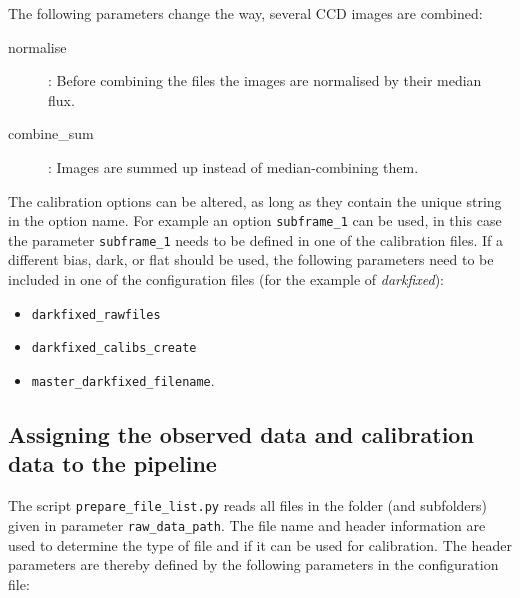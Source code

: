 \documentclass[10pt,a4paper]{article}
\begin{document}
\noindent The following parameters change the way, several CCD images are combined:
\begin{description}
  \item[normalise] : Before combining the files the images are normalised by their median flux.
  \item[combine\_sum] : Images are summed up instead of median-combining them.
\end{description}

\noindent The calibration options can be altered, as long as they contain the unique string in the option name. For example an option \verb|subframe_1| can be used, in this case the parameter \verb|subframe_1| needs to be defined in one of the calibration files. If a different bias, dark, or flat should be used, the following parameters need to be included in one of the configuration files (for the example of \textit{darkfixed}):
\begin{itemize}\setlength\itemsep{0em}
  \item \verb|darkfixed_rawfiles|
  \item \verb|darkfixed_calibs_create|
  \item \verb|master_darkfixed_filename|.
\end{itemize}


\subsection{Assigning the observed data and calibration data to the pipeline}
\label{Section:prepare_files}

The script \verb|prepare_file_list.py| reads all files in the folder (and subfolders) given in parameter \verb|raw_data_path|. The file name and header information are used to determine the type of file and if it can be used for calibration. The header parameters are thereby defined by the following parameters in the configuration file:
\end{document}
